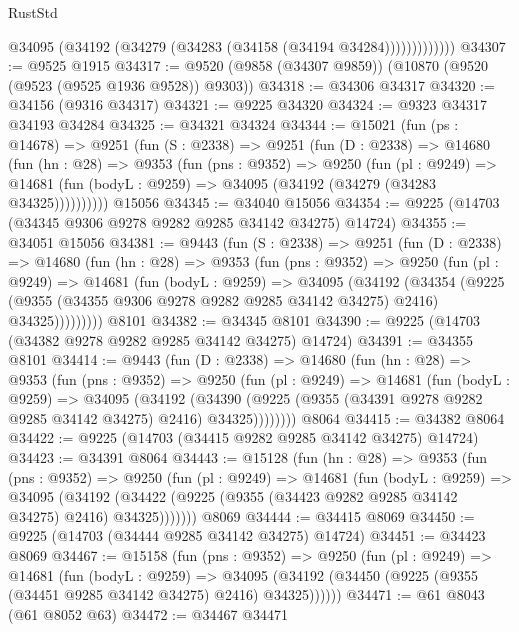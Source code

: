 \begin{lexlean}{RustStd}
\begin{coremodule}
                  @34095 (@34192 (@34279 (@34283 (@34158 (@34194 @34284)))))))))))))
@34307 := @9525 @1915
@34317 := @9520 (@9858 (@34307 @9859)) (@10870 (@9520 (@9523 (@9525 @1936 @9528)) @9303))
@34318 := @34306 @34317
@34320 := @34156 (@9316 @34317)
@34321 := @9225 @34320
@34324 := @9323 @34317 @34193 @34284
@34325 := @34321 @34324
@34344 := @15021
    (fun (ps : @14678) =>
    @9251
      (fun (S : @2338) =>
      @9251
        (fun (D : @2338) =>
        @14680
          (fun (hn : @28) =>
          @9353
            (fun (pns : @9352) =>
            @9250
              (fun (pl : @9249) =>
              @14681 (fun (bodyL : @9259) => @34095 (@34192 (@34279 (@34283 @34325))))))))))
    @15056
@34345 := @34040 @15056
@34354 := @9225 (@14703 (@34345 @9306 @9278 @9282 @9285 @34142 @34275) @14724)
@34355 := @34051 @15056
@34381 := @9443
    (fun (S : @2338) =>
    @9251
      (fun (D : @2338) =>
      @14680
        (fun (hn : @28) =>
        @9353
          (fun (pns : @9352) =>
          @9250
            (fun (pl : @9249) =>
            @14681
              (fun (bodyL : @9259) =>
              @34095
                (@34192
                  (@34354
                    (@9225
                      (@9355 (@34355 @9306 @9278 @9282 @9285 @34142 @34275) @2416)
                      @34325)))))))))
    @8101
@34382 := @34345 @8101
@34390 := @9225 (@14703 (@34382 @9278 @9282 @9285 @34142 @34275) @14724)
@34391 := @34355 @8101
@34414 := @9443
    (fun (D : @2338) =>
    @14680
      (fun (hn : @28) =>
      @9353
        (fun (pns : @9352) =>
        @9250
          (fun (pl : @9249) =>
          @14681
            (fun (bodyL : @9259) =>
            @34095
              (@34192
                (@34390 (@9225 (@9355 (@34391 @9278 @9282 @9285 @34142 @34275) @2416) @34325))))))))
    @8064
@34415 := @34382 @8064
@34422 := @9225 (@14703 (@34415 @9282 @9285 @34142 @34275) @14724)
@34423 := @34391 @8064
@34443 := @15128
    (fun (hn : @28) =>
    @9353
      (fun (pns : @9352) =>
      @9250
        (fun (pl : @9249) =>
        @14681
          (fun (bodyL : @9259) =>
          @34095
            (@34192 (@34422 (@9225 (@9355 (@34423 @9282 @9285 @34142 @34275) @2416) @34325)))))))
    @8069
@34444 := @34415 @8069
@34450 := @9225 (@14703 (@34444 @9285 @34142 @34275) @14724)
@34451 := @34423 @8069
@34467 := @15158
    (fun (pns : @9352) =>
    @9250
      (fun (pl : @9249) =>
      @14681
        (fun (bodyL : @9259) =>
        @34095 (@34192 (@34450 (@9225 (@9355 (@34451 @9285 @34142 @34275) @2416) @34325))))))
@34471 := @61 @8043 (@61 @8052 @63)
@34472 := @34467 @34471

\end{coremodule}
\end{lexlean}
